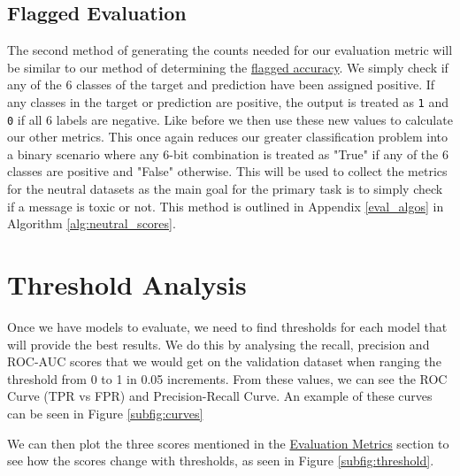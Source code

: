 \subsection{Flagged Evaluation}

The second method of generating the counts needed for our evaluation metric will be similar to our method of determining the \hyperref[flag_acc]{flagged accuracy}. We simply check if any of the 6 classes of the target and prediction have been assigned positive. If any classes in the target or prediction are positive, the output is treated as \verb|1| and \verb|0| if all 6 labels are negative. Like before we then use these new values to calculate our other metrics. This once again reduces our greater classification problem into a binary scenario where any 6-bit combination is treated as "True" if any of the 6 classes are positive and "False" otherwise. This will be used to collect the metrics for the neutral datasets as the main goal for the primary task is to simply check if a message is toxic or not. This method is outlined in Appendix \ref{eval_algos} in Algorithm \ref{alg:neutral_scores}.

\section{Threshold Analysis}
\label{threshold}

Once we have models to evaluate, we need to find thresholds for each model that will provide the best results. We do this by analysing the recall, precision and ROC-AUC scores that we would get on the validation dataset when ranging the threshold from 0 to 1 in 0.05 increments. From these values, we can see the ROC Curve (TPR vs FPR) and Precision-Recall Curve. An example of these curves can be seen in Figure \ref{subfig:curves}

We can then plot the three scores mentioned in the \hyperref[eval_metrics]{Evaluation Metrics} section to see how the scores change with thresholds, as seen in Figure \ref{subfig:threshold}.


